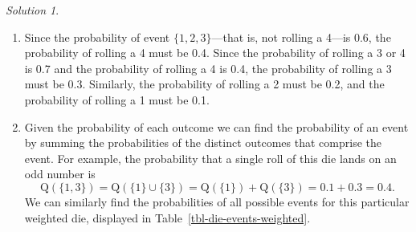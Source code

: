 \documentclass[
  letterpaper,
  DIV=11,
  numbers=noendperiod]{scrreprt}
\providecommand{\tightlist}{%
  \setlength{\itemsep}{0pt}\setlength{\parskip}{0pt}}
\theoremstyle{plain}
\theoremstyle{definition}
\theoremstyle{definition}
\theoremstyle{definition}
\theoremstyle{remark}
\newtheorem{refsolution}{Solution}[chapter]
\begin{document}
\begin{tcolorbox}[enhanced jigsaw, opacityback=0, rightrule=.15mm, coltitle=black, colframe=quarto-callout-tip-color-frame, toprule=.15mm, colbacktitle=quarto-callout-tip-color!10!white, opacitybacktitle=0.6, left=2mm, toptitle=1mm, breakable, title={Solution (click to expand)}, bottomtitle=1mm, colback=white, leftrule=.75mm, titlerule=0mm, arc=.35mm, bottomrule=.15mm]

\begin{refsolution}
\leavevmode

\begin{enumerate}
\def\labelenumi{\arabic{enumi}.}
\tightlist
\item
  Since the probability of event \(\{1, 2, 3\}\)---that is, not rolling
  a 4---is 0.6, the probability of rolling a 4 must be\footnotemark{}
  0.4. Since the probability of rolling a 3 or 4 is 0.7 and the
  probability of rolling a 4 is 0.4, the probability of rolling a 3 must
  be 0.3. Similarly, the probability of rolling a 2 must be 0.2, and the
  probability of rolling a 1 must be 0.1.
\item
  Given the probability of each outcome we can find the probability of
  an event by summing the probabilities of the distinct outcomes that
  comprise the event. For example, the probability that a single roll of
  this die lands on an odd number is \[
  \textrm{Q}(\{1, 3\}) = \textrm{Q}(\{1\}\cup \{3\}) = \textrm{Q}(\{1\}) + \textrm{Q}(\{3\}) = 0.1+ 0.3 = 0.4.
  \] We can similarly find the probabilities of all possible events for
  this particular weighted die, displayed in
  Table~\ref{tbl-die-events-weighted}.
\end{enumerate}

\label{sol-die-weighted}

\end{refsolution}

\end{tcolorbox}

\end{document}
